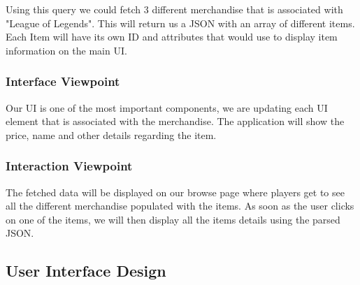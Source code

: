 \documentclass[onecolumn, draftclsnofoot,10pt, compsoc]{IEEEtran}
\begin{document}
\noindent Using this query we could fetch 3 different merchandise that is associated with "League of Legends". This will return us a JSON with an array of different items. Each Item will have its own ID and attributes that would use to display item information on the main UI.
\subsubsection{Interface Viewpoint}
Our UI is one of the most important components, we are updating each UI element that is associated with the merchandise. The application will show the price, name and other details regarding the item.
\subsubsection{Interaction Viewpoint}
The fetched data will be displayed on our browse page where players get to see all the different merchandise populated with the items. As soon as the user clicks on one of the items, we will then display all the items details using the parsed JSON. 
\subsection{User Interface Design}
\end{document}
